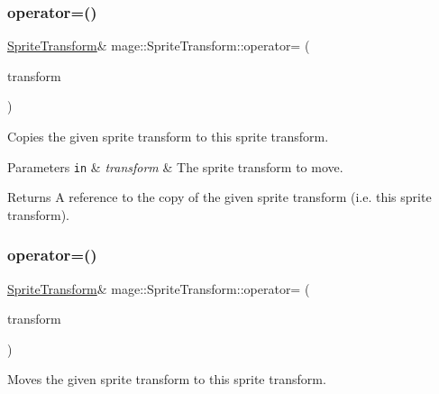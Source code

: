 \subsubsection{\texorpdfstring{operator=()}{operator=()}\hspace{0.1cm}{\footnotesize\ttfamily [1/2]}}
{\footnotesize\ttfamily \mbox{\hyperlink{classmage_1_1_sprite_transform}{Sprite\+Transform}}\& mage\+::\+Sprite\+Transform\+::operator= (\begin{DoxyParamCaption}\item[{const \mbox{\hyperlink{classmage_1_1_sprite_transform}{Sprite\+Transform}} \&}]{transform }\end{DoxyParamCaption})\hspace{0.3cm}{\ttfamily [default]}}

Copies the given sprite transform to this sprite transform.


\begin{DoxyParams}[1]{Parameters}
\mbox{\tt in}  & {\em transform} & The sprite transform to move. \\
\hline
\end{DoxyParams}
\begin{DoxyReturn}{Returns}
A reference to the copy of the given sprite transform (i.\+e. this sprite transform). 
\end{DoxyReturn}
\mbox{\label{classmage_1_1_sprite_transform_a9278d3fd0a6d346b188515b67a1adfc2}} 
\subsubsection{\texorpdfstring{operator=()}{operator=()}\hspace{0.1cm}{\footnotesize\ttfamily [2/2]}}
{\footnotesize\ttfamily \mbox{\hyperlink{classmage_1_1_sprite_transform}{Sprite\+Transform}}\& mage\+::\+Sprite\+Transform\+::operator= (\begin{DoxyParamCaption}\item[{\mbox{\hyperlink{classmage_1_1_sprite_transform}{Sprite\+Transform}} \&\&}]{transform }\end{DoxyParamCaption})\hspace{0.3cm}{\ttfamily [default]}}

Moves the given sprite transform to this sprite transform.


